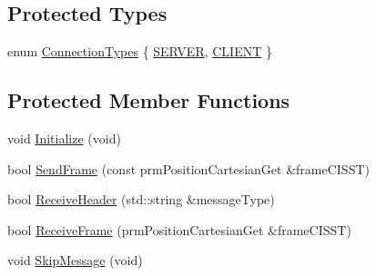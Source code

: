 \subsection*{Protected Types}
\begin{DoxyCompactItemize}
\item 
enum \hyperlink{classmts_open_i_g_t_link_aa7353a6a3f98f611defbaf89f13c8a27}{Connection\+Types} \{ \hyperlink{classmts_open_i_g_t_link_aa7353a6a3f98f611defbaf89f13c8a27a9cbc41def3c5107a96ae88dc2b81be4c}{S\+E\+R\+V\+E\+R}, 
\hyperlink{classmts_open_i_g_t_link_aa7353a6a3f98f611defbaf89f13c8a27a25025b3db414b3c15bc4c6664b876065}{C\+L\+I\+E\+N\+T}
 \}
\end{DoxyCompactItemize}
\subsection*{Protected Member Functions}
\begin{DoxyCompactItemize}
\item 
void \hyperlink{classmts_open_i_g_t_link_a77e185ccfb62504a0715138865d15b85}{Initialize} (void)
\item 
bool \hyperlink{classmts_open_i_g_t_link_a179b3a9dbe4601891943a646a2692329}{Send\+Frame} (const prm\+Position\+Cartesian\+Get \&frame\+C\+I\+S\+S\+T)
\item 
bool \hyperlink{classmts_open_i_g_t_link_aed77b6cd845636b25631465c28540ed2}{Receive\+Header} (std\+::string \&message\+Type)
\item 
bool \hyperlink{classmts_open_i_g_t_link_a9299853f065591da9999bc027f12c70a}{Receive\+Frame} (prm\+Position\+Cartesian\+Get \&frame\+C\+I\+S\+S\+T)
\item 
void \hyperlink{classmts_open_i_g_t_link_abaa5ab92e7ce6b8af3a777ca0e36605e}{Skip\+Message} (void)
\end{DoxyCompactItemize}
